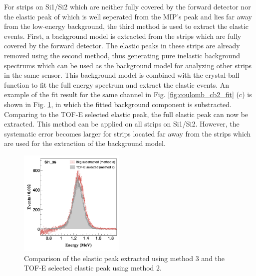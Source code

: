 \documentclass[fleqn,twocolumn,a4paper]{ikpar}
\begin{document}
\par
\medskip

For strips on Si1/Si2 which are neither fully covered by the forward detector nor
the elastic peak of which is well seperated from the MIP's peak and lies
far away from the low-energy background, the third method is used to
extract the elastic events.
First, a background model is extracted from the strips which are fully covered by the forward detector.
The elastic peaks in these strips are already removed using the second method, thus generating 
pure inelastic background spectrums which can be used as the background model
for analyzing other strips in the same sensor.
This background model is combined with the crystal-ball function to fit the full
energy spectrum and extract the elastic events.
An example of the fit result for the same channel in Fig. \ref{fig:coulomb_cb2_fit}
(c) is shown in Fig. \ref{fig:bkg_vs_tofe}, in which the fitted background component is substracted. 
Comparing to the TOF-E selected elastic peak, the full elastic peak can now be extracted.
This method can be applied on all strips on Si1/Si2.
However, the systematic error becomes larger for strips located far away from
the strips which are used for the extraction of the background model.
\begin{figure}[!htb]
	\includegraphics[width=0.45\textwidth]{./bkg_vs_tofe.png}
  \caption{Comparison of the elastic peak extracted using method 3 and the TOF-E
    selected elastic peak using method 2.}
  \label{fig:bkg_vs_tofe}
\end{figure}

\par
\medskip
\end{document}
